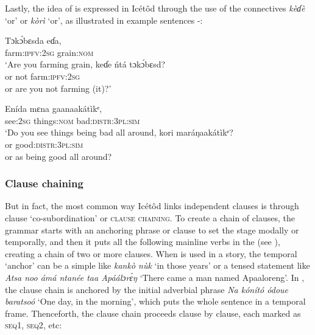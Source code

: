Lastly, the idea of  is expressed in Icétôd through the use of the connectives \textit{kèɗè} ‘or’ or \textit{kòrì} ‘or’, as illustrated in example sentences -:



\ea\label{ex:syn:66}
  \ea
  \gll Tɔk\'{ɔ}bɛs{\Í}da       eɗa,  \\
farm:\textsc{ipfv:2sg}   grain:\textsc{nom}    \\
  \glt ‘Are you farming grain, 
  \medskip
  \ex
  \gll keɗe   ńtá   tɔk\'{ɔ}bɛs{\Î}d\ᶤ? \\
or   not   farm:\textsc{ipfv:2sg}    \\
  \glt or are you not farming (it)?’
  \z  
\z


\ea\label{ex:syn:67}
  \ea
  \gll Enída       mɛna     gaanaakátìkᵉ, \\
see:\textsc{2sg}   things:\textsc{nom}   bad:\textsc{distr:3pl:sim}    \\
  \glt ‘Do you see things being bad all around, 
  \medskip
  \ex
  \gll kori   maráŋaakátìkᵉ? \\
or   good:\textsc{distr:3pl:sim}    \\
  \glt or as being good all around?
  \z  
\z


\subsubsection{Clause chaining}\label{sec:10.8.2}

But in fact, the most common way Icétôd links independent clauses is through clause ‘co-subordination’ or \textsc{clause chaining}. To create a chain of clauses, the grammar starts with an anchoring phrase or clause to set the stage modally or temporally, and then it puts all the following mainline verbs in the  (see ), creating a chain of two or more clauses. When  is used in a story, the temporal ‘anchor’ can be a simple  like \textit{ka{\Í}n{\Í}kò nùk\ᵘ} ‘in those years’ or a tensed statement like \textit{Atsa noo ámá ntanée taa Apáálɔr\'{ɛ}ŋ} ‘There came a man named Apaaloreng’. In , the clause chain is anchored by the initial adverbial phrase \textit{Na kónít}\textit{ó ódoue baratsoó} ‘One day, in the morning’, which puts the whole sentence in a temporal frame. Thenceforth, the clause chain proceeds clause by clause, each marked as \textsc{seq1}, \textsc{seq2}, etc:




